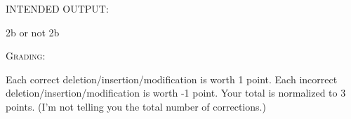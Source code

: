 INTENDED OUTPUT:
\begin{console}
2b or not 2b
\end{console}

\textsc{Grading}:
\begin{tightlist}
\li Each correct deletion/insertion/modification is worth 1 point.
\li Each incorrect deletion/insertion/modification is worth -1 point.
\li Your total is normalized to 3 points. 
(I'm not telling you the total number of corrections.)
\end{tightlist}

